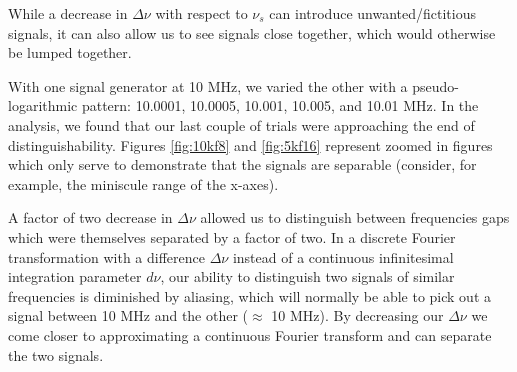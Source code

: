 \documentclass[a4paper]{article}
\begin{document}
While a decrease in $\Delta \nu$ with respect to $\nu_s$ can introduce unwanted/fictitious signals, it can also allow us to see signals close together, which would otherwise be lumped together.

With one signal generator at 10 MHz, we varied the other with a pseudo-logarithmic pattern: 10.0001, 10.0005, 10.001, 10.005, and 10.01 MHz. In the analysis, we found that our last couple of trials were approaching the end of distinguishability. Figures \ref{fig:10kf8} and \ref{fig:5kf16} represent zoomed in figures which only serve to demonstrate that the signals are separable (consider, for example, the miniscule range of the x-axes).

A factor of two decrease in $\Delta \nu$ allowed us to distinguish between frequencies gaps which were themselves separated by a factor of two. In a discrete Fourier transformation with a difference $\Delta \nu$ instead of a continuous infinitesimal integration parameter $d\nu$, our ability to distinguish two signals of similar frequencies is diminished by aliasing, which will normally be able to pick out a signal between 10 MHz and the other ($\approx$ 10 MHz). By decreasing our $\Delta \nu$ we come closer to approximating a continuous Fourier transform and can separate the two signals.

\end{document}
